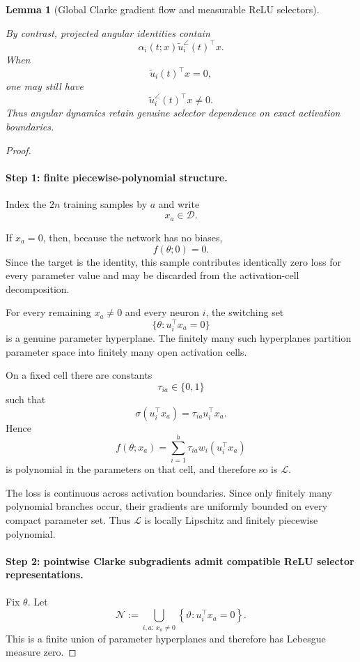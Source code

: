 \documentclass{article} %
\theoremstyle{plain}
\newtheorem{lemma}[theorem]{Lemma}
\theoremstyle{definition}
\theoremstyle{remark}
\begin{document}
\begin{lemma}[Global Clarke gradient flow and measurable ReLU selectors]
\begin{enumerate}[label=(\roman*),leftmargin=2.4em]
By contrast, projected angular identities contain
\[
\alpha_i(t;x)
\widetilde u_i^\angle(t)^\top x.
\]
When
\[
\widetilde u_i(t)^\top x=0,
\]
one may still have
\[
\widetilde u_i^\angle(t)^\top x\neq0.
\]
Thus angular dynamics retain genuine selector dependence on exact activation
boundaries.

\end{enumerate}
\end{lemma}

\begin{proof}\leavevmode

\paragraph{Step 1: finite piecewise-polynomial structure.}

Index the $2n$ training samples by $a$ and write
\[
x_a\in\mathcal D.
\]

If $x_a=0$, then, because the network has no biases,
\[
f(\theta;0)=0.
\]
Since the target is the identity, this sample contributes identically zero
loss for every parameter value and may be discarded from the activation-cell
decomposition.

For every remaining $x_a\neq0$ and every neuron $i$, the switching set
\[
\{\theta:u_i^\top x_a=0\}
\]
is a genuine parameter hyperplane. The finitely many such hyperplanes
partition parameter space into finitely many open activation cells.

On a fixed cell there are constants
\[
\tau_{ia}\in\{0,1\}
\]
such that
\[
\sigma(u_i^\top x_a)
=
\tau_{ia}u_i^\top x_a.
\]
Hence
\[
f(\theta;x_a)
=
\sum_{i=1}^h
\tau_{ia}w_i(u_i^\top x_a)
\]
is polynomial in the parameters on that cell, and therefore so is
$\mathcal L$.

The loss is continuous across activation boundaries. Since only finitely
many polynomial branches occur, their gradients are uniformly bounded on
every compact parameter set. Thus $\mathcal L$ is locally Lipschitz and
finitely piecewise polynomial.

\paragraph{Step 2: pointwise Clarke subgradients admit compatible ReLU
selector representations.}

Fix $\theta$. Let
\[
\mathcal N
:=
\bigcup_{i,a:\,x_a\neq0}
\left\{
\vartheta:
u_i^\top x_a=0
\right\}.
\]
This is a finite union of parameter hyperplanes and therefore has Lebesgue
measure zero.


\end{proof}
\end{document}
